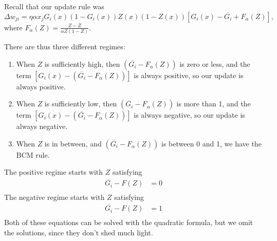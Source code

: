 \documentclass{article}
\theoremstyle{definition}
\begin{document}
Recall that our update rule was
$$\Delta w_{ji} = \eta \alpha x_j G_i(x) (1 - G_i(x)) Z(x) (1 - Z(x))
\left[ G_i(x) - \overline{G_i} + F_\alpha(Z) \right],$$ where
$F_\alpha(Z) = \frac{Z - \overline{Z}}{\alpha Z(1 - Z)}$.

There are thus three different regimes:
\begin{enumerate}
\item When $Z$ is sufficiently high, then $(\overline{G_i} -
  F_\alpha(Z))$ is zero or less, and the term $\left[ G_i(x) -
    (\overline{G_i} - F_\alpha(Z)) \right]$ is always positive, so our
  update is always positive.
\item When $Z$ is sufficiently low, then $(\overline{G_i} -
  F_\alpha(Z))$ is more than 1, and the term $\left[ G_i(x) -
    (\overline{G_i} - F_\alpha(Z)) \right]$ is always negative, so our
  update is always negative.
\item When $Z$ is in between, and $(\overline{G_i} - F_\alpha(Z))$ is
  between 0 and 1, we have the BCM rule.
\end{enumerate}

The positive regime starts with $Z$ satisfying
\begin{align*}
\overline{G_i} - F(Z) &= 0\\
\end{align*}
The negative regime starts with $Z$ satisfying
\begin{align*}
\overline{G_i} - F(Z) &= 1\\
\end{align*}
Both of these equations can be solved with the quadratic formula, but
we omit the solutions, since they don't shed much light.
\end{document}
